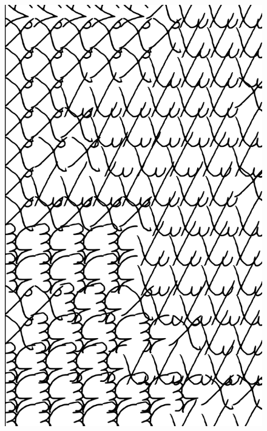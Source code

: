 \makeatletter\@openrightfalse
\movetooddpage
\begin{absolutelynopagebreak}
\begin{vplace}
\begin{figure}[H]
\begin{adjustwidth}{-0.99cm}{}
  \centering
  \vspace*{-1.97cm}
  \hspace*{-0.65cm}
  \includegraphics[width=115mm]{./imgs/img9.pdf}  
  \hfill
\end{adjustwidth}

\thispagestyle{empty}

\end{figure}
\end{vplace}

\end{absolutelynopagebreak}

